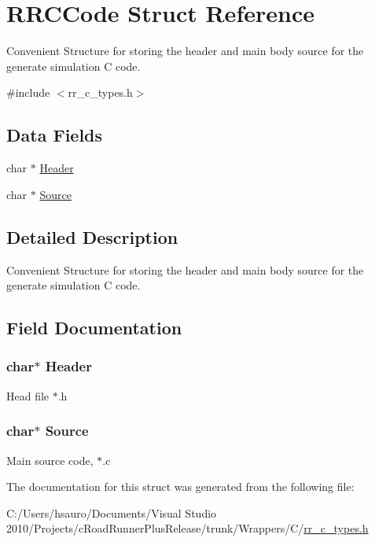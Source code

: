 \hypertarget{struct_r_r_c_code}{
\section{\-R\-R\-C\-Code \-Struct \-Reference}
\label{struct_r_r_c_code}
}


\-Convenient \-Structure for storing the header and main body source for the generate simulation \-C code.  




{\ttfamily \#include $<$rr\-\_\-c\-\_\-types.\-h$>$}

\subsection*{\-Data \-Fields}
\begin{DoxyCompactItemize}
\item 
char $\ast$ \hyperlink{struct_r_r_c_code_a129503fa396e877e8400bb7cdc9774b5}{\-Header}
\item 
char $\ast$ \hyperlink{struct_r_r_c_code_a23fa2e731d8e1576c9095868b9651305}{\-Source}
\end{DoxyCompactItemize}


\subsection{\-Detailed \-Description}
\-Convenient \-Structure for storing the header and main body source for the generate simulation \-C code. 

\subsection{\-Field \-Documentation}
\hypertarget{struct_r_r_c_code_a129503fa396e877e8400bb7cdc9774b5}{
\subsubsection[{\-Header}]{\setlength{\rightskip}{0pt plus 5cm}char$\ast$ {\bf \-Header}}}
\label{struct_r_r_c_code_a129503fa396e877e8400bb7cdc9774b5}
\-Head file $\ast$.h \hypertarget{struct_r_r_c_code_a23fa2e731d8e1576c9095868b9651305}{
\subsubsection[{\-Source}]{\setlength{\rightskip}{0pt plus 5cm}char$\ast$ {\bf \-Source}}}
\label{struct_r_r_c_code_a23fa2e731d8e1576c9095868b9651305}
\-Main source code, $\ast$.c 

\-The documentation for this struct was generated from the following file\-:\begin{DoxyCompactItemize}
\item 
\-C\-:/\-Users/hsauro/\-Documents/\-Visual Studio 2010/\-Projects/c\-Road\-Runner\-Plus\-Release/trunk/\-Wrappers/\-C/\hyperlink{rr__c__types_8h}{rr\-\_\-c\-\_\-types.\-h}\end{DoxyCompactItemize}
